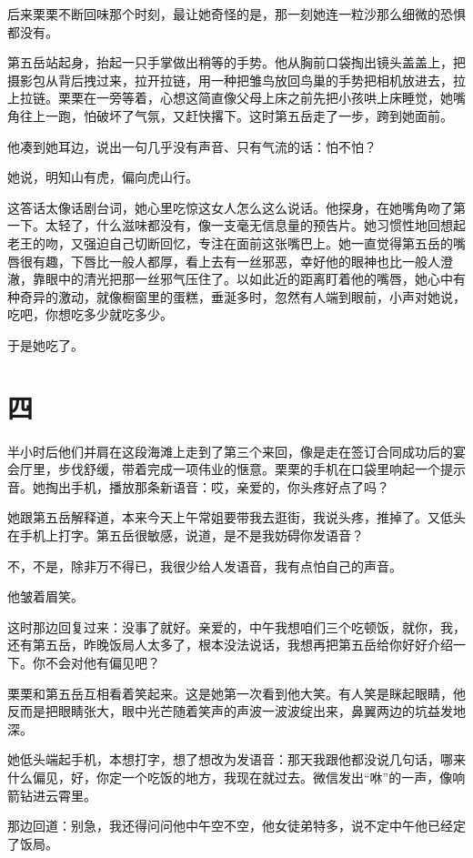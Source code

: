 \documentclass[lang=cn,newtx,12pt,scheme=chinese]{elegantbook}
\begin{document}
后来栗栗不断回味那个时刻，最让她奇怪的是，那一刻她连一粒沙那么细微的恐惧都没有。

第五岳站起身，抬起一只手掌做出稍等的手势。他从胸前口袋掏出镜头盖盖上，把摄影包从背后拽过来，拉开拉链，用一种把雏鸟放回鸟巢的手势把相机放进去，拉上拉链。栗栗在一旁等着，心想这简直像父母上床之前先把小孩哄上床睡觉，她嘴角往上一跑，怕破坏了气氛，又赶快撂下。这时第五岳走了一步，跨到她面前。

他凑到她耳边，说出一句几乎没有声音、只有气流的话：怕不怕？

她说，明知山有虎，偏向虎山行。

这答话太像话剧台词，她心里吃惊这女人怎么这么说话。他探身，在她嘴角吻了第一下。太轻了，什么滋味都没有，像一支毫无信息量的预告片。她习惯性地回想起老王的吻，又强迫自己切断回忆，专注在面前这张嘴巴上。她一直觉得第五岳的嘴唇很有趣，下唇比一般人都厚，看上去有一丝邪恶，幸好他的眼神也比一般人澄澈，靠眼中的清光把那一丝邪气压住了。以如此近的距离盯着他的嘴唇，她心中有种奇异的激动，就像橱窗里的蛋糕，垂涎多时，忽然有人端到眼前，小声对她说，吃吧，你想吃多少就吃多少。

于是她吃了。
\section{四}
半小时后他们并肩在这段海滩上走到了第三个来回，像是走在签订合同成功后的宴会厅里，步伐舒缓，带着完成一项伟业的惬意。栗栗的手机在口袋里响起一个提示音。她掏出手机，播放那条新语音：哎，亲爱的，你头疼好点了吗？

她跟第五岳解释道，本来今天上午常姐要带我去逛街，我说头疼，推掉了。又低头在手机上打字。第五岳很敏感，说道，是不是我妨碍你发语音？

不，不是，除非万不得已，我很少给人发语音，我有点怕自己的声音。

他皱着眉笑。

这时那边回复过来：没事了就好。亲爱的，中午我想咱们三个吃顿饭，就你，我，还有第五岳，昨晚饭局人太多了，根本没法说话，我想再把第五岳给你好好介绍一下。你不会对他有偏见吧？

栗栗和第五岳互相看着笑起来。这是她第一次看到他大笑。有人笑是眯起眼睛，他反而是把眼睛张大，眼中光芒随着笑声的声波一波波绽出来，鼻翼两边的坑益发地深。

她低头端起手机，本想打字，想了想改为发语音：那天我跟他都没说几句话，哪来什么偏见，好，你定一个吃饭的地方，我现在就过去。微信发出“咻”的一声，像响箭钻进云霄里。

那边回道：别急，我还得问问他中午空不空，他女徒弟特多，说不定中午他已经定了饭局。
\end{document}
